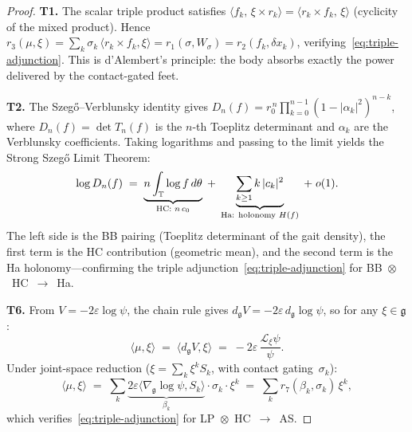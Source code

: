 \begin{proof}
\textbf{T1.}\;
The scalar triple product satisfies
$\langle f_k,\, \xi \times r_k \rangle
= \langle r_k \times f_k,\, \xi \rangle$
(cyclicity of the mixed product).
Hence
$r_3(\mu, \xi) = \sum_k \sigma_k\,\langle r_k \times f_k, \xi \rangle
= r_1(\sigma, W_\sigma) = r_2(f_k, \delta x_k)$,
verifying~\eqref{eq:triple-adjunction}.
This is d'Alembert's principle:
the body absorbs exactly the power delivered by the
contact-gated feet.

\medskip\noindent
\textbf{T2.}\;
The Szeg\H{o}--Verblunsky identity gives
$D_n(f) = r_0^{\,n} \prod_{k=0}^{n-1}(1 - |\alpha_k|^2)^{n-k}$,
where $D_n(f) = \det T_n(f)$ is the $n$-th Toeplitz determinant
and $\alpha_k$ are the Verblunsky coefficients.
Taking logarithms and passing to the limit yields the
Strong Szeg\H{o} Limit Theorem:
\[
  \log D_n(f)
  \;=\; \underbrace{n \int_{\mathbb{T}} \log f\, d\theta}_{\text{HC: }n\,c_0}
  \;+\; \underbrace{\sum_{k \geq 1} k\,|c_k|^2}_{\text{Ha: holonomy }H(f)}
  \;+\; o(1).
\]
The left side is the BB pairing (Toeplitz determinant of the
gait density), the first term is the HC contribution (geometric
mean), and the second term is the Ha holonomy---confirming
the triple adjunction~\eqref{eq:triple-adjunction} for
BB~$\otimes$~HC~$\to$~Ha.

\medskip\noindent
\textbf{T6.}\;
From $V = -2\varepsilon \log\psi$, the chain rule gives
$d_{\mathfrak{g}} V = -2\varepsilon\, d_{\mathfrak{g}} \log\psi$,
so for any $\xi \in \mathfrak{g}$:
\[
  \langle \mu, \xi \rangle
  \;=\; \langle d_{\mathfrak{g}} V, \xi \rangle
  \;=\; -2\varepsilon\,\frac{\mathcal{L}_\xi \psi}{\psi}.
\]
Under joint-space reduction
($\xi = \sum_k \xi^k S_k$, with contact gating~$\sigma_k$):
\[
  \langle \mu, \xi \rangle
  \;=\; \sum_k \underbrace{2\varepsilon
    \langle \nabla_{\mathfrak{g}} \log\psi, S_k\rangle}_{\beta_k}
    \cdot \sigma_k \cdot \xi^k
  \;=\; \sum_k r_7(\beta_k, \sigma_k)\,\xi^k,
\]
which verifies~\eqref{eq:triple-adjunction} for
LP~$\otimes$~HC~$\to$~AS.
\end{proof}

